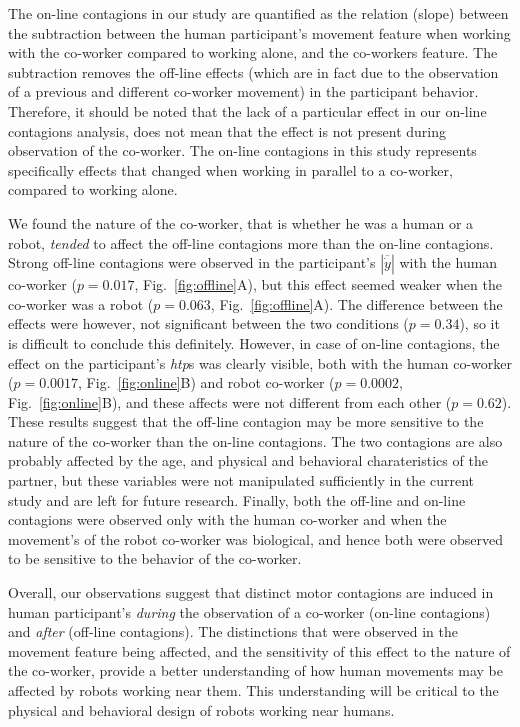 \documentclass[a4paper, 12pt, oneside]{Thesis}  %
\begin{document}
The on-line contagions in our study are quantified as the relation (slope) between the subtraction between the human participant's movement feature when working with the co-worker compared to working alone, and the co-workers feature. The subtraction removes the off-line effects (which are in fact due to the observation of a previous and different co-worker movement) in the participant behavior. Therefore, it should be noted that the lack of a particular effect in our on-line contagions analysis, does not mean that the effect is not present during observation of the co-worker. The on-line contagions in this study represents specifically effects that changed when working in parallel to a co-worker, compared to working alone.

We found the nature of the co-worker, that is whether he was a human or a robot, \textit{tended} to affect the off-line contagions more than the on-line contagions. Strong off-line contagions were observed in the participant's $|\overline{\dot{y}}|$ with the human co-worker ($p = 0.017$, Fig.~\ref{fig:offline}A), but this effect seemed weaker when the co-worker was a robot ($p = 0.063$, Fig.~\ref{fig:offline}A). The difference between the effects were however, not significant between the two conditions ($p = 0.34$), so it is difficult to conclude this definitely. However, in case of on-line contagions, the effect on the participant's {\it htp}s was clearly visible, both with the human co-worker ($p = 0.0017$, Fig.~\ref{fig:online}B) and robot co-worker ($p = 0.0002$, Fig.~\ref{fig:online}B), and these affects were not different from each other ($p = 0.62$). These results suggest that the off-line contagion may be more sensitive to the nature of the co-worker than the on-line contagions. The two contagions are also probably affected by the age, and physical and behavioral charateristics of the partner, but these variables were not manipulated sufficiently in the current study and are left for future research. Finally, both the off-line and on-line contagions were observed only with the human co-worker and when the movement's of the robot co-worker was biological, and hence both were observed to be sensitive to the behavior of the co-worker.

Overall, our observations suggest that distinct motor contagions are induced in human participant's \emph{during} the observation of a co-worker (on-line contagions) and \emph{after} (off-line contagions). The distinctions that were observed in the movement feature being affected, and the sensitivity of this effect to the nature of the co-worker, provide a better understanding of how human movements may be affected by robots working near them. This understanding will be critical to the physical and behavioral design of robots working near humans.
\end{document}
